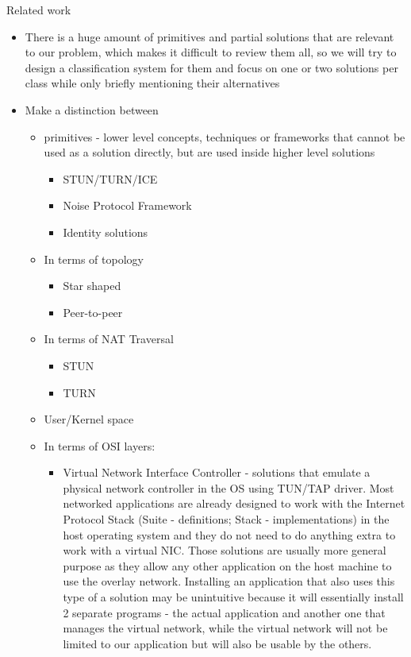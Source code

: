 \label{notes__02000-related-work.md}
\begin{frame}{Related work}
\label{notes__02000-related-work.md__related-work}
\begin{itemize}
\item
  There is a huge amount of primitives and partial solutions that are relevant to our problem, which makes it difficult to review them all, so we will try to design a classification system for them and focus on one or two solutions per class while only briefly mentioning their alternatives
\item
  Make a distinction between

  \begin{itemize}
  \tightlist
  \item
    primitives - lower level concepts, techniques or frameworks that cannot be used as a solution directly, but are used inside higher level solutions

    \begin{itemize}
    \tightlist
    \item
      STUN/TURN/ICE
    \item
      Noise Protocol Framework
    \item
      Identity solutions
    \end{itemize}
  \item
    In terms of topology

    \begin{itemize}
    \tightlist
    \item
      Star shaped
    \item
      Peer-to-peer
    \end{itemize}
  \item
    In terms of NAT Traversal

    \begin{itemize}
    \tightlist
    \item
      STUN
    \item
      TURN
    \end{itemize}
  \item
    User/Kernel space
  \item
    In terms of OSI layers:

    \begin{itemize}
    \tightlist
    \item
      Virtual Network Interface Controller - solutions that emulate a physical network controller in the OS using TUN/TAP driver. Most networked applications are already designed to work with the Internet Protocol Stack (Suite - definitions; Stack - implementations) in the host operating system and they do not need to do anything extra to work with a virtual NIC. Those solutions are usually more general purpose as they allow any other application on the host machine to use the overlay network. Installing an application that also uses this type of a solution may be unintuitive because it will essentially install 2 separate programs - the actual application and another one that manages the virtual network, while the virtual network will not be limited to our application but will also be usable by the others.


\end{itemize}
\end{itemize}
\end{itemize}
\end{frame}
